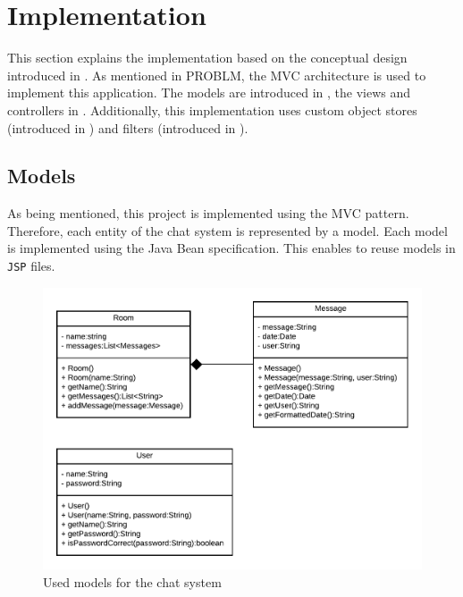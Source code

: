 \section{Implementation}\label{sec:03_impl}
This section explains the implementation based on the conceptual design introduced in . 
As mentioned in PROBLM, the MVC architecture is used to implement this application.
The models are introduced in , the views and controllers in .
Additionally, this implementation uses custom object stores (introduced in ) and filters (introduced in ).





\subsection{Models}\label{subsec:03_impl_models}
As being mentioned, this project is implemented using the MVC pattern. Therefore, each entity of the chat system is represented by a model.
Each model is implemented using the Java Bean specification. This enables to reuse models in \texttt{JSP} files.

\begin{figure}[h]
\centering
\includegraphics[scale=0.8]{images/03_impl/models}
\caption{Used models for the chat system}
\label{fig:03_impl_models_models}
\end{figure}

